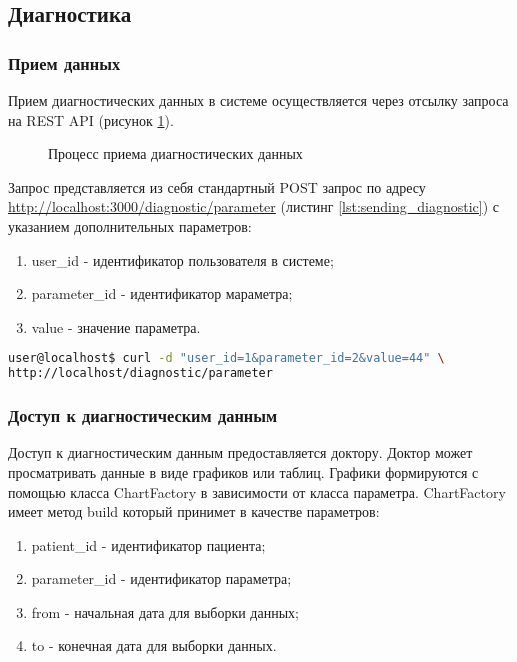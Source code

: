 \newpage
\subsection{Диагностика}
\subsubsection{Прием данных}
Прием диагностических данных в системе осуществляется через отсылку запроса на
REST API (рисунок \ref{ris:diagnostic_post_request}).

\begin{figure}[h]
\caption{Процесс приема диагностических данных}
\label{ris:diagnostic_post_request}
\end{figure}

Запрос представляется из себя стандартный POST запрос по адресу
\url{http://localhost:3000/diagnostic/parameter} (листинг
\ref{lst:sending_diagnostic}) с указанием дополнительных параметров:
\begin{enumerate}
  \item user\_id - идентификатор пользователя в системе;
  \item parameter\_id - идентификатор мараметра;
  \item value - значение параметра.   
\end{enumerate}

\begin{lstlisting}[language=Bash,caption=Отправка диагностических данных
,label={lst:sending_diagnostic}] 
user@localhost$ curl -d "user_id=1&parameter_id=2&value=44" \
http://localhost/diagnostic/parameter
\end{lstlisting}

\subsubsection{Доступ к диагностическим данным}
Доступ к диагностическим данным предоставляется доктору. Доктор может
просматривать данные в виде графиков или таблиц. Графики формируются с помощью
класса ChartFactory в зависимости от класса параметра. ChartFactory имеет метод
build который принимет в качестве параметров:
\begin{enumerate}
  \item patient\_id - идентификатор пациента;
  \item parameter\_id - идентификатор параметра;
  \item from - начальная дата для выборки данных;
  \item to - конечная дата для выборки данных.
\end{enumerate}

